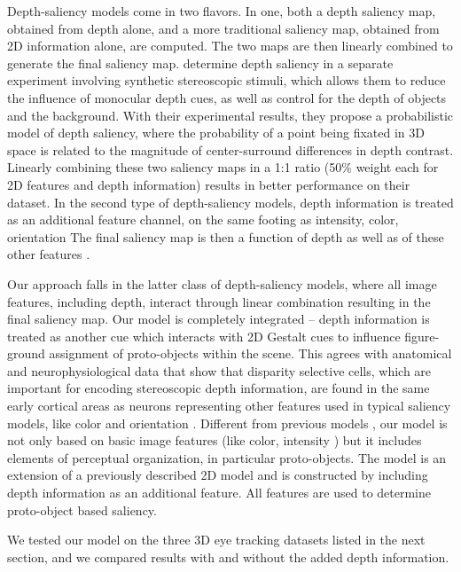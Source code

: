 Depth-saliency models come in two flavors. In one, both a depth saliency map, obtained from depth alone, and a more traditional saliency map, obtained from 2D information alone, are computed. The two
maps are then linearly combined to generate the final saliency map. \cite{Wang_etal13} determine depth saliency in a separate experiment involving synthetic stereoscopic stimuli, which allows them to reduce the influence of monocular depth cues, as well as control for the depth of objects and the background. With their experimental results, they propose a probabilistic model of depth saliency, where the probability of a point being fixated in 3D space is related to the
magnitude of center-surround differences in depth contrast. Linearly
combining these two saliency maps in a 1:1 ratio (50\% weight each for
2D features and depth information) results in better performance on
their dataset. In the second type of depth-saliency models, depth
information is treated as an additional feature channel, on the same
footing as intensity, color, orientation \etc The final saliency map is then a function of depth as well as of these other features \citep{Ouerhani_etal00,Jost_etal04,Hugli_etal05}.

Our approach falls in the latter class of depth-saliency models, where
all image features, including depth, interact through linear combination resulting in the final saliency map. Our model is completely integrated -- depth information is treated as another cue
which interacts with 2D Gestalt cues to influence figure-ground assignment of proto-objects within the scene. This agrees with anatomical and neurophysiological data that show that disparity selective cells, which are important for encoding stereoscopic depth
information, are found in the same early cortical areas as neurons representing other features used in typical saliency models, like
color and orientation \citep{Hubel_Wiesel62,Poggio_etal88b}. Different
from previous models \citep{Ouerhani_etal00,Jost_etal04,Hugli_etal05},
our model is not only based on basic image features (like color, intensity \etc) but it includes elements of perceptual organization, in particular proto-objects. The model is an extension of a previously
described 2D model \citep{Russell_etal14} and is constructed by including depth information as an additional feature. All features are used to determine proto-object based saliency.

We tested our model on the three 3D eye tracking datasets listed in the next section, and we compared results with and without the added
depth information.


